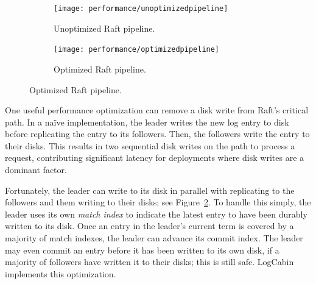 \begin{figure}
\centering

\begin{subfigure}{\textwidth}
\centering
\texttt{[image: performance/unoptimizedpipeline]}
\caption{
Unoptimized Raft pipeline.
}
\label{fig:performance:unoptimizedpipeline}
\end{subfigure}

\begin{subfigure}{\textwidth}
\centering
\texttt{[image: performance/optimizedpipeline]}
\caption{
Optimized Raft pipeline.
}
\label{fig:performance:optimizedpipeline}
\end{subfigure}

\label{fig:performance:pipeline}
\end{figure}

One useful performance optimization can remove a disk write from Raft's
critical path.
In a na\"ive implementation, the leader writes the new log entry to disk
before replicating the entry to its followers.
Then, the followers write the entry to their disks.
This results in two
sequential disk writes on the path to process a request, contributing
significant latency for deployments where disk writes are a dominant
factor.

Fortunately, the leader can write to its disk in parallel with
replicating to the followers and them writing to their disks; see
Figure~\ref{fig:performance:optimizedpipeline}. To handle this simply,
the leader uses its own \emph{match index} to indicate the latest entry
to have been durably written to its disk. Once an entry in the leader's
current term is covered by a majority of match indexes, the leader can
advance its commit index. The leader may even commit an entry before it
has been written to its own disk, if a majority of followers have
written it to their disks; this is still safe.
LogCabin implements this optimization.

